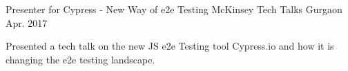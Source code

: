 \begin{cventries}

  \cventry
    {Presenter for Cypress - New Way of e2e Testing} %
    {McKinsey Tech Talks} %
    {Gurgaon} %
    {Apr. 2017} %
    {
      \begin{cvitems} %
        \item {Presented a tech talk on the new JS e2e Testing tool Cypress.io and how it is changing the e2e testing landscape.}
      \end{cvitems}
    }

\end{cventries}
